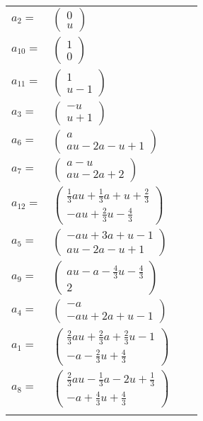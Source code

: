 \documentclass[1p]{elsarticle_modified}
\theoremstyle{definition}
\begin{document}
\begin{tabular}{m{7pt} m{180pt} m{7pt} m{180pt} }
\flushright $a_{2}=$&$\begin{pmatrix}0\\u\end{pmatrix}$ \\
\flushright $a_{10}=$&$\begin{pmatrix}1\\0\end{pmatrix}$ \\
\flushright $a_{11}=$&$\begin{pmatrix}1\\u-1\end{pmatrix}$ \\
\flushright $a_{3}=$&$\begin{pmatrix}- u\\u+1\end{pmatrix}$ \\
\flushright $a_{6}=$&$\begin{pmatrix}a\\a u-2 a- u+1\end{pmatrix}$ \\
\flushright $a_{7}=$&$\begin{pmatrix}a- u\\a u-2 a+2\end{pmatrix}$ \\
\flushright $a_{12}=$&$\begin{pmatrix}\frac{1}{3} a u+\frac{1}{3} a+u+\frac{2}{3}\\- a u+\frac{2}{3} u-\frac{4}{3}\end{pmatrix}$ \\
\flushright $a_{5}=$&$\begin{pmatrix}- a u+3 a+u-1\\a u-2 a- u+1\end{pmatrix}$ \\
\flushright $a_{9}=$&$\begin{pmatrix}a u- a-\frac{4}{3} u-\frac{4}{3}\\2\end{pmatrix}$ \\
\flushright $a_{4}=$&$\begin{pmatrix}- a\\- a u+2 a+u-1\end{pmatrix}$ \\
\flushright $a_{1}=$&$\begin{pmatrix}\frac{2}{3} a u+\frac{2}{3} a+\frac{2}{3} u-1\\- a-\frac{2}{3} u+\frac{4}{3}\end{pmatrix}$ \\
\flushright $a_{8}=$&$\begin{pmatrix}\frac{2}{3} a u-\frac{1}{3} a-2 u+\frac{1}{3}\\- a+\frac{4}{3} u+\frac{4}{3}\end{pmatrix}$\\&\end{tabular}
\end{document}
